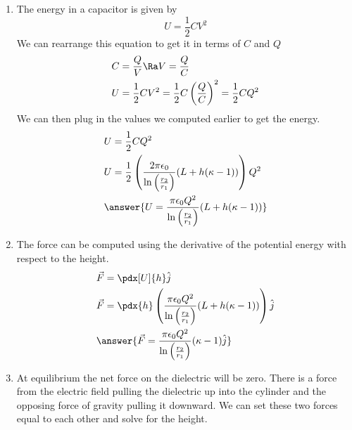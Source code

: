 {\begin{enumerate}
    \begin{align*}
        &C_1=\frac{2\pi\epsilon_0 (L-h)}{\ln\left(\frac{r_2}{r_1}\right)}\\
        &C_2=\frac{2\pi\epsilon_0 h\kappa}{\ln\left(\frac{r_2}{r_1}\right)}\\
        &C_\text{total}=C_1+C_2\\
        &C_\text{total}=\frac{2\pi\epsilon_0 (L-h)}{\ln\left(\frac{r_2}{r_1}\right)}+\frac{2\pi\epsilon_0 h\kappa}{\ln\left(\frac{r_2}{r_1}\right)}\\
        &\answer{C_\text{total}=\frac{2\pi\epsilon_0}{\ln\left(\frac{r_2}{r_1}\right)}(L+h(\kappa-1))}\\
    \end{align*}
    \item The energy in a capacitor is given by
    \[U=\frac{1}{2}CV^2\]
    We can rearrange this equation to get it in terms of $C$ and $Q$
    \begin{align*}
        &C=\frac{Q}{V}\Ra V=\frac{Q}{C}\\
        &U=\frac{1}{2}CV^2=\frac{1}{2}C\left(\frac{Q}{C}\right)^2=\frac{1}{2}CQ^2
    \end{align*}
    We can then plug in the values we computed earlier to get the energy.
    \begin{align*}
        &U=\frac{1}{2}CQ^2\\
        &U=\frac{1}{2}\left(\frac{2\pi\epsilon_0}{\ln\left(\frac{r_2}{r_1}\right)}(L+h(\kappa-1))\right)Q^2\\
        &\answer{U=\frac{\pi\epsilon_0Q^2}{\ln\left(\frac{r_2}{r_1}\right)}(L+h(\kappa-1))}
    \end{align*}
    \item The force can be computed using the derivative of the potential energy with respect to the height.
    \begin{align*}
        &\vec{F}=\pdx[U]{h}\hat{j}\\
        &\vec{F}=\pdx{h}\left(\frac{\pi\epsilon_0Q^2}{\ln\left(\frac{r_2}{r_1}\right)}(L+h(\kappa-1))\right)\hat{j}\\
        &\answer{\vec{F}=\frac{\pi\epsilon_0Q^2}{\ln\left(\frac{r_2}{r_1}\right)}(\kappa-1)\hat{j}}
    \end{align*}
    \item At equilibrium the net force on the dielectric will be zero. There is a force from the electric field pulling the dielectric up into the cylinder and the opposing force of gravity pulling it downward. We can set these two forces equal to each other and solve for the height.

\end{enumerate}}
